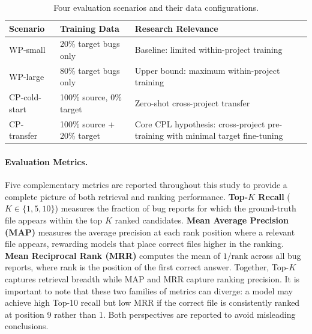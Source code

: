 \documentclass[12pt,table,xcdraw]{article}
\begin{document}
\begin{table}[h]
\centering
\caption{Four evaluation scenarios and their data configurations.}
\label{tab:scenarios}
\begin{tabular}{|l|l|p{6.5cm}|}
\hline
\textbf{Scenario} & \textbf{Training Data} & \textbf{Research Relevance} \\ \hline
WP-small & 20\% target bugs only & Baseline: limited within-project training \\ \hline
WP-large & 80\% target bugs only & Upper bound: maximum within-project training \\ \hline
CP-cold-start & 100\% source, 0\% target & Zero-shot cross-project transfer \\ \hline
CP-transfer & 100\% source + 20\% target & Core CPL hypothesis: cross-project pre-training with minimal target fine-tuning \\ \hline
\end{tabular}
\end{table}

\paragraph{Evaluation Metrics.}
Five complementary metrics are reported throughout this study to provide a complete picture of both retrieval and ranking performance. \textbf{Top-$K$ Recall} ($K \in \{1, 5, 10\}$) measures the fraction of bug reports for which the ground-truth file appears within the top $K$ ranked candidates. \textbf{Mean Average Precision (MAP)} measures the average precision at each rank position where a relevant file appears, rewarding models that place correct files higher in the ranking. \textbf{Mean Reciprocal Rank (MRR)} computes the mean of $1/\text{rank}$ across all bug reports, where rank is the position of the first correct answer. Together, Top-$K$ captures retrieval breadth while MAP and MRR capture ranking precision. It is important to note that these two families of metrics can diverge: a model may achieve high Top-10 recall but low MRR if the correct file is consistently ranked at position 9 rather than 1. Both perspectives are reported to avoid misleading conclusions.
\end{document}

